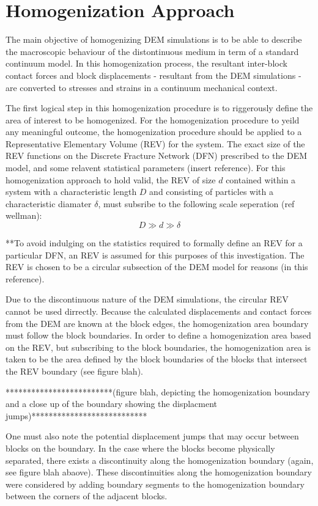 \section{Homogenization Approach}
The main objective of homogenizing DEM simulations is to be able to describe the macroscopic behaviour of the distontinuous medium in term of a standard continuum model. In this homogenization process, the resultant inter-block contact forces and block displacements - resultant from the DEM simulations - are converted to stresses and strains in a continuum mechanical context.

The first logical step in this homogenization procedure is to riggerously define the area of interest to be homogenized. For the homogenization procedure to yeild any meaningful outcome, the homogenization procedure should be applied to a Representative Elementary Volume (REV) for the system. The exact size of the REV functions on the Discrete Fracture Network (DFN) prescribed to the DEM model, and some relavent statistical parameters (insert reference). For this homogenization approach to hold valid, the REV of size $d$ contained within a system with a characteristic length $D$ and consisting of particles with a characteristic diamater $\delta$, must subsribe to the following scale seperation (ref wellman):
\begin{equation}
\label{eqn:hom1a}
D \gg d \gg \delta
\end{equation}

**To avoid indulging on the statistics required to formally define an REV for a particular DFN, an REV is assumed for this purposes of this investigation. The REV is chosen to be a circular subsection of the DEM model for reasons (in this reference). 

Due to the discontinuous nature of the DEM simulations, the circular REV cannot be used dirrectly. Because the calculated displacements and contact forces from the DEM are known at the block edges, the homogenization area boundary must follow the block boundaries. In order to define a homogenization area based on the REV, but subscribing to the block boundaries, the homogenization area is taken to be the area defined by the block boundaries of the blocks that intersect the REV boundary (see figure blah).


*************************(figure blah, depicting the homogenization boundary and a close up of the boundary showing the displacment jumps)***************************


One must also note the potential displacement jumps that may occur between blocks on the boundary. In the case where the blocks become physically separated, there exists a discontinuity along the homogenization boundary (again, see figure blah abaove). These discontinuities along the homogenization boundary were considered by adding boundary segments to the homogenization boundary between the corners of the adjacent blocks. 

